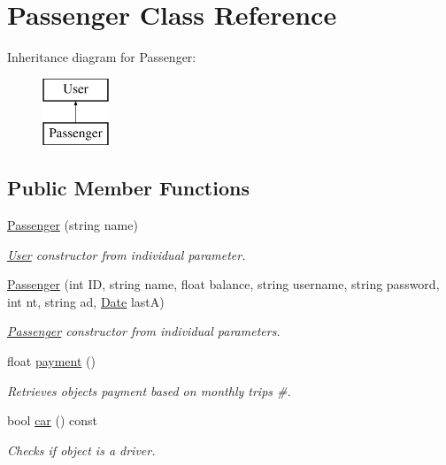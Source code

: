 \hypertarget{class_passenger}{}\section{Passenger Class Reference}
\label{class_passenger}
Inheritance diagram for Passenger\+:\begin{figure}[H]
\begin{center}
\leavevmode
\includegraphics[height=2.000000cm]{class_passenger}
\end{center}
\end{figure}
\subsection*{Public Member Functions}
\begin{DoxyCompactItemize}
\item 
\hyperlink{group___user_ga00628e580d270e68278cc76994c841b1}{Passenger} (string name)
\begin{DoxyCompactList}\small\item\em \hyperlink{class_user}{User} constructor from individual parameter. \end{DoxyCompactList}\item 
\hyperlink{group___user_ga0c1aecc465a9e8887f2b9bd3e784438a}{Passenger} (int ID, string name, float balance, string username, string password, int nt, string ad, \hyperlink{class_date}{Date} lastA)
\begin{DoxyCompactList}\small\item\em \hyperlink{class_passenger}{Passenger} constructor from individual parameters. \end{DoxyCompactList}\item 
float \hyperlink{group___user_ga9535b6486d1f33f055d6c7385780ec68}{payment} ()
\begin{DoxyCompactList}\small\item\em Retrieves object\textquotesingle{}s payment based on monthly trips \#. \end{DoxyCompactList}\item 
bool \hyperlink{group___user_gaeb69b29d53079577e41f070da1f442dd}{car} () const
\begin{DoxyCompactList}\small\item\em Checks if object is a driver. \end{DoxyCompactList}\end{DoxyCompactItemize}
